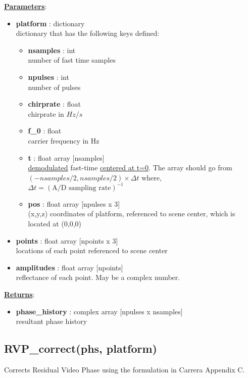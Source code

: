 \documentclass{article}
\newcommand{\defs}[2]{\textbf{{#1}} : {#2}}
\begin{document}
\noindent \underline{\textbf{Parameters}}:

\begin{itemize}
  \item \defs{platform}{dictionary}\\
  	dictionary that has the following keys defined:
  \begin{itemize}
    \item \defs{nsamples}{int}\\
    	number of fast time samples
    \item \defs{npulses}{int}\\
    	number of pulses
    \item \defs{chirprate}{float}\\
    	chirprate in $Hz/s$
    \item \defs{f\_0}{float}\\
    	carrier frequency in Hz
    \item \defs{t}{float array [nsamples]}\\
    	\underline{demodulated} fast-time \underline{centered at t=0}.  The array should go from $(-nsamples/2, nsamples/2)\times\Delta t$ where, $\Delta t = (\mbox{A/D sampling rate})^{-1}$
    \item \defs{pos}{float array [npulses x 3]}\\
       	(x,y,z) coordinates of platform, referenced to scene center, which is located at (0,0,0)
  \end{itemize}
  \item \defs{points}{float array [npoints x 3]}\\
  	locations of each point referenced to scene center
  \item \defs{amplitudes}{float array [npoints]}\\
  	reflectance of each point.  May be a complex number.
\end{itemize}

\noindent \underline{\textbf{Returns}}:
\begin{itemize}
	\item \defs{phase\_history}{complex array [npulses x nsamples]}\\
	resultant phase history
\end{itemize}

\newpage

\subsection{RVP\_correct(phs, platform)}
Corrects Residual Video Phase using the formulation in Carrera Appendix C.\\
\end{document}
